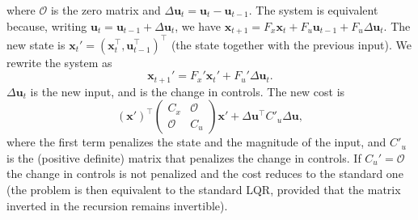 \documentclass[10pt, a4paper]{report}
\begin{document}
where $\mathcal O$ is the zero matrix and $\Delta\mathbf u_t=\mathbf u_t-\mathbf u_{t-1}$. The system is equivalent because, writing $\mathbf u_t=\mathbf u_{t-1}+\Delta\mathbf u_t$, we have $\mathbf x_{t+1}=F_x\mathbf x_t+F_u\mathbf u_{t-1}+F_u\Delta\mathbf u_t$. The new state is $\mathbf x_t'=(\mathbf x_t^\top,\mathbf u_{t-1}^\top)^\top$ (the state together with the previous input).
We rewrite the system as\begin{equation}
    \mathbf x_{t+1}'=F_x'\mathbf x_t'+F_u'\Delta\mathbf u_t.
\end{equation}
$\Delta\mathbf{u}_t$ is the new input, and is the change in controls. The new cost is\begin{equation}
    (\mathbf x')^\top \begin{pmatrix}
        C_x& \mathcal O \\ 
        \mathcal O & C_u
    \end{pmatrix}\mathbf x'+\Delta\mathbf u^\top C'_u\Delta\mathbf u,
\end{equation}
where the first term penalizes the state and the magnitude of the input, and $C'_u$ is the (positive definite) matrix that penalizes the change in controls. If $C_u'=\mathcal O$ the change in controls is not penalized and the cost reduces to the standard one (the problem is then equivalent to the standard LQR, provided that the matrix inverted in the recursion remains invertible).
\end{document}
